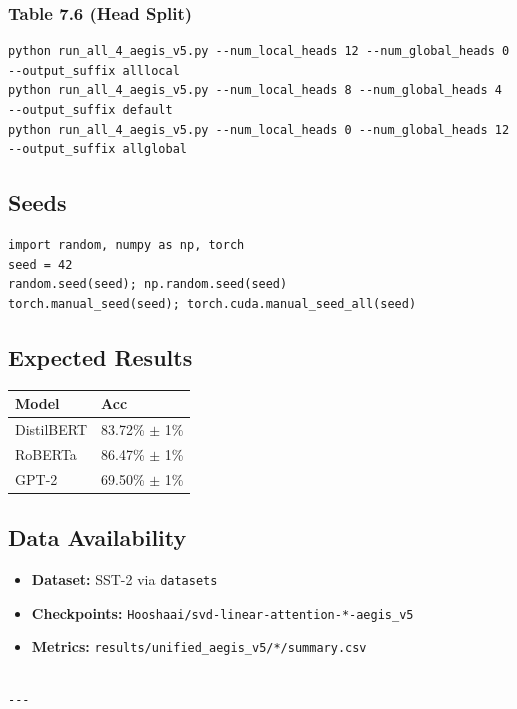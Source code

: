 \subsubsection{Table 7.6 (Head Split)}
\begin{lstlisting}
python run_all_4_aegis_v5.py --num_local_heads 12 --num_global_heads 0 --output_suffix alllocal
python run_all_4_aegis_v5.py --num_local_heads 8 --num_global_heads 4 --output_suffix default
python run_all_4_aegis_v5.py --num_local_heads 0 --num_global_heads 12 --output_suffix allglobal
\end{lstlisting}

\subsection{Seeds}

\begin{lstlisting}
import random, numpy as np, torch
seed = 42
random.seed(seed); np.random.seed(seed)
torch.manual_seed(seed); torch.cuda.manual_seed_all(seed)
\end{lstlisting}

\subsection{Expected Results}

\begin{table}[H]
\centering
\small
\begin{tabular}{ll}
\toprule
\textbf{Model} & \textbf{Acc} \\
\midrule
DistilBERT & 83.72\% $\pm$ 1\% \\
RoBERTa & 86.47\% $\pm$ 1\% \\
GPT-2 & 69.50\% $\pm$ 1\% \\
\bottomrule
\end{tabular}
\end{table}

\subsection{Data Availability}

\begin{itemize}
\item \textbf{Dataset:} SST-2 via \texttt{datasets}
\item \textbf{Checkpoints:} \texttt{Hooshaai/svd-linear-attention-*-aegis\_v5}
\item \textbf{Metrics:} \texttt{results/unified\_aegis\_v5/*/summary.csv}
\end{itemize}
\begin{lstlisting}

---
\end{lstlisting}